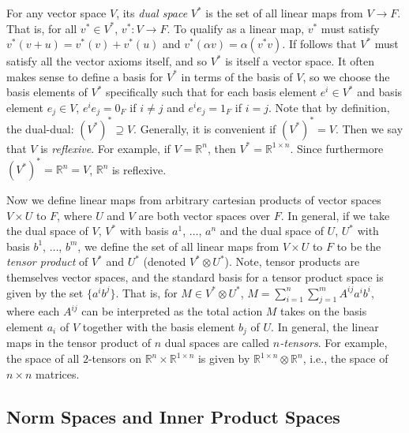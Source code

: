 \documentclass[12pt]{article}
\begin{document}
For any vector space $V$, its {\it dual space} $V^*$ is the set of all linear
maps from $V \rightarrow F$.
That is, for all $v^* \in V^*$, $v^* : V\rightarrow F$.
To qualify as a linear map, $v^*$ must satisfy $v^*(v+u) = v^*(v) + v^*(u)$
and $v^*(\alpha v) = \alpha (v^*v)$.
If follows that $V^*$ must satisfy all the vector axioms itself, and so
$V^*$ is itself a vector space.
It often makes sense to define a basis for $V^*$ in terms of
the basis of $V$, so we choose the basis elements of $V^*$ specifically
such that for each basis element $e^i \in V^*$ and basis element $e_j \in V$, 
$e^ie_j = 0_F$ if $i \neq j$ and $e^ie_j = 1_F$ if $i = j$.
Note that by definition, the dual-dual: $(V^*)^* \supseteq V$.
Generally, it is convenient if $(V^*)^* = V$.
Then we say that $V$ is {\it reflexive}.
For example, if $V = \mathbb{R}^n$, then $V^* = \mathbb{R}^{1\times n}$.
Since furthermore $(V^*)^* = \mathbb{R}^n = V$, $\mathbb{R}^n$ is reflexive.

Now we define linear maps from arbitrary cartesian products of vector
spaces $V \times U$ to $F$, where $U$ and $V$ are both vector spaces over $F$.
In general, if we take the dual space of $V$, $V^*$ with basis $a^1$, $\ldots$,
$a^n$ and the dual space of $U$, $U^*$ with basis $b^1$, $\ldots$, $b^m$,
we define the set of all linear maps from $V \times U$ to $F$ to be the 
{\it tensor product} of $V^*$ and $U^*$ (denoted $V^* \otimes U^*$).
Note, tensor products are themselves vector spaces,
and the standard basis for a tensor product space is given by the set 
$\{a^ib^j\}$.
That is, for $M \in V^* \otimes U^*$, 
$M = \sum_{i=1}^n\sum_{j=1}^m A^{ij} a^ib^i$,
where each $A^{ij}$ can be interpreted as the total action $M$ takes on the 
basis element $a_i$ of $V$ together with the basis element $b_j$ of $U$.
In general, the linear maps in the tensor product of $n$ dual spaces are
called {\it $n$-tensors}.
For example, the space of all $2$-tensors on 
$\mathbb{R}^n \times \mathbb{R}^{1\times n}$ is
given by $\mathbb{R}^{1\times n} \otimes \mathbb{R}^n$, i.e., the
space of $n \times n$ matrices.

\subsection*{Norm Spaces and Inner Product Spaces}
\end{document}
